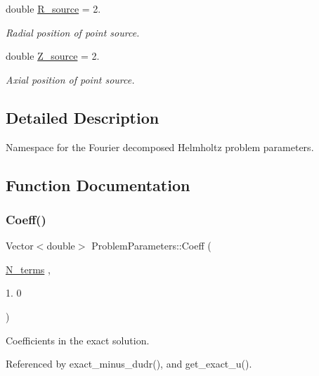 \begin{DoxyCompactItemize}
double \hyperlink{namespaceProblemParameters_a42c148c7f3bed95827acf8d86c2c6089}{R\+\_\+source} = 2.
\begin{DoxyCompactList}\small\item\em Radial position of point source. \end{DoxyCompactList}\item 
double \hyperlink{namespaceProblemParameters_a346993de7a274e1828af3f8fc8ca8b13}{Z\+\_\+source} = 2.
\begin{DoxyCompactList}\small\item\em Axial position of point source. \end{DoxyCompactList}\end{DoxyCompactItemize}


\subsection{Detailed Description}
Namespace for the Fourier decomposed Helmholtz problem parameters. 

\subsection{Function Documentation}
\mbox{\label{namespaceProblemParameters_a20cc9776e745842f6126f4cd17659d19}} 
\subsubsection{\texorpdfstring{Coeff()}{Coeff()}}
{\footnotesize\ttfamily Vector$<$double$>$ Problem\+Parameters\+::\+Coeff (\begin{DoxyParamCaption}\item[{\hyperlink{namespaceProblemParameters_a6361f0f1c4a120e62d28db64baa84b40}{N\+\_\+terms}}]{,  }\item[{1.}]{0 }\end{DoxyParamCaption})}



Coefficients in the exact solution. 



Referenced by exact\+\_\+minus\+\_\+dudr(), and get\+\_\+exact\+\_\+u().

\mbox{\label{namespaceProblemParameters_aa544d1f3e384d3283f7113512931ea8f}} 
